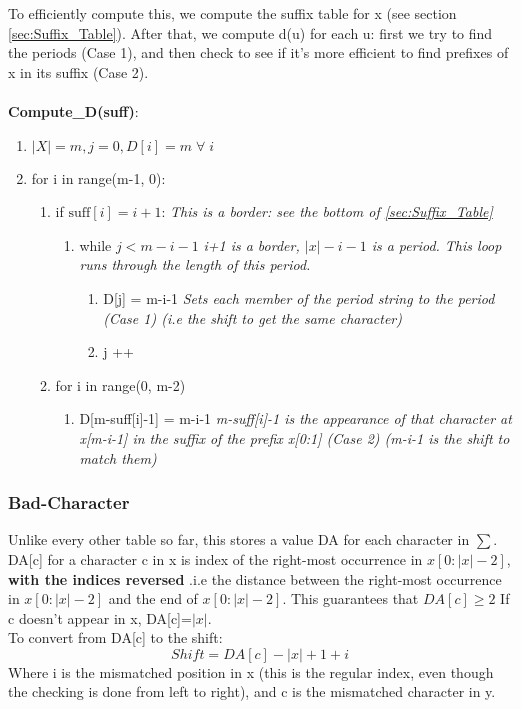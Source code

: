 \noindent To efficiently compute this, we compute the suffix table for x (see section \ref{sec:Suffix_Table}). 
After that, we compute d(u) for each u: first we try to find the periods (Case 1), and then check to see if it's more efficient to find prefixes of x in its suffix (Case 2).\\ \\
\textbf{Compute\_D(suff)}:
\begin{enumerate}[label=\Alph*]
    \item \(|X| = m, j=0, D[i] = m\; \forall\; i \)
    \item for i in range(m-1, 0):
\begin{enumerate}[label=\arabic*]
    \item if $ \text{suff}[i] = i+1 $:  \emph{This is a border: see the bottom of \ref{sec:Suffix_Table}}
    \begin{enumerate}
        \item [] while \( j < m-i-1\) \emph{i+1 is a border, $|x|-i-1$ is a period. This loop runs through the length of this period.}
        \begin{enumerate}
            \item D[j] = m-i-1 \emph{Sets each member of the period string to the period (Case 1) (i.e the shift to get the same character)}
            \item j ++
        \end{enumerate}    
    \end{enumerate}    
    \item for i in range(0, m-2)
    \begin{enumerate}
        \item D[m-suff[i]-1] = m-i-1 \emph{m-suff[i]-1 is the appearance of that character at x[m-i-1] in the suffix of the prefix x[0:1] (Case 2) (m-i-1 is the shift to match them)}
    \end{enumerate}  
\end{enumerate}    
\end{enumerate}
\newpage
\subsubsection{Bad-Character}
Unlike every other table so far, this stores a value DA for each character in $\sum$. DA[c] for a character c in x is index of the right-most occurrence in $x[0:|x|-2]$, \textbf{with the indices reversed }.i.e the distance between the right-most occurrence in $x[0:|x|-2]$ and the end of $x[0:|x|-2]$. This guarantees that $DA[c] \geq 2$ If c doesn't appear in x, DA[c]=$|x|$.\\
To convert from DA[c] to the shift:
\begin{equation}
    Shift = DA[c]-|x|+1+i 
\end{equation}
Where i is the mismatched position in x (this is the regular index, even though the checking is done from left to right), and c is the mismatched character in y. 
